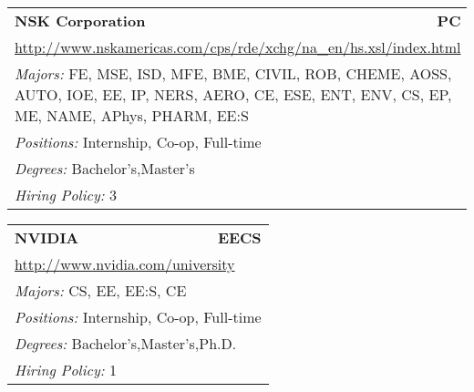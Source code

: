 \documentclass[twoside]{article}
\begin{document}
\begin{center}
\begin{multicols}{3}
\begin{FlushLeft}
\begin{minipage}{\columnwidth}\begin{tabularx}{.95\columnwidth}{Xr}
                 {\Large\bf NSK Corporation} & {\Large\bf PC}\\
    \multicolumn{2}{p{.95\columnwidth}}{\url{http://www.nskamericas.com/cps/rde/xchg/na_en/hs.xsl/index.html}}\\
    \multicolumn{2}{p{.95\columnwidth}}{\emph{Majors:} FE, MSE, ISD, MFE, BME, CIVIL, ROB, CHEME, AOSS, AUTO, IOE, EE, IP, NERS, AERO, CE, ESE, ENT, ENV, CS, EP, ME, NAME, APhys, PHARM, EE:S}\\
    \multicolumn{2}{p{.95\columnwidth}}{\emph{Positions:} Internship, Co-op, Full-time}\\
    \multicolumn{2}{p{.95\columnwidth}}{\emph{Degrees:} Bachelor's,Master's}\\
    \multicolumn{2}{p{.95\columnwidth}}{\emph{Hiring Policy:} 3}\\
    \end{tabularx}
    
\end{minipage}
 
\begin{minipage}{\columnwidth}\begin{tabularx}{.95\columnwidth}{Xr}
                 {\Large\bf NVIDIA} & {\Large\bf EECS}\\
    \multicolumn{2}{p{.95\columnwidth}}{\url{http://www.nvidia.com/university}}\\
    \multicolumn{2}{p{.95\columnwidth}}{\emph{Majors:} CS, EE, EE:S, CE}\\
    \multicolumn{2}{p{.95\columnwidth}}{\emph{Positions:} Internship, Co-op, Full-time}\\
    \multicolumn{2}{p{.95\columnwidth}}{\emph{Degrees:} Bachelor's,Master's,Ph.D.}\\
    \multicolumn{2}{p{.95\columnwidth}}{\emph{Hiring Policy:} 1}\\
    \end{tabularx}
    
\end{minipage}
 

\end{FlushLeft}
\end{multicols}
\end{center}
\end{document}
